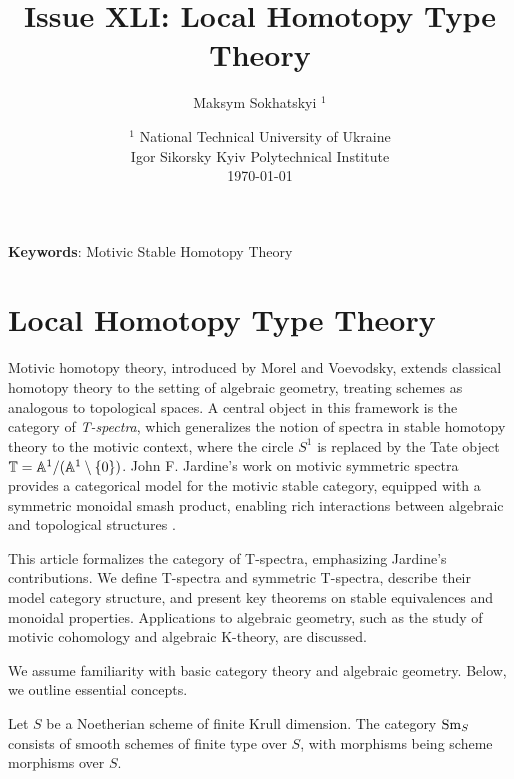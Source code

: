 \documentclass{article}
\begin{document}
\title{Issue XLI: Local Homotopy Type Theory}
\author{Maksym Sokhatskyi $^1$}
\date{ $^1$ National Technical University of Ukraine \\
       \small Igor Sikorsky Kyiv Polytechnical Institute \\
       \today }

\maketitle

\begin{abstract}
\end{abstract}

{\bf Keywords}: Motivic Stable Homotopy Theory

\ifincludeTOC
  \tableofcontents
\fi

\section{Local Homotopy Type Theory}

Motivic homotopy theory, introduced by Morel and Voevodsky, extends classical homotopy
theory to the setting of algebraic geometry, treating schemes as analogous to topological spaces.
A central object in this framework is the category of \emph{T-spectra}, which generalizes
the notion of spectra in stable homotopy theory to the motivic context, where
the circle \( S^1 \) is replaced by the Tate object \( \mathbb{T} = \mathbb{A}^1 / (\mathbb{A}^1 \setminus \{0\}) \).
John F. Jardine’s work on motivic symmetric spectra provides a categorical model for the
motivic stable category, equipped with a symmetric monoidal smash product, enabling rich
interactions between algebraic and topological structures \cite{Jardine2000MotivicSS}.

This article formalizes the category of T-spectra, emphasizing Jardine’s contributions.
We define T-spectra and symmetric T-spectra, describe their model category structure,
and present key theorems on stable equivalences and monoidal properties. Applications
to algebraic geometry, such as the study of motivic cohomology and algebraic K-theory, are discussed.

We assume familiarity with basic category theory and algebraic geometry. Below, we outline essential concepts.

\begin{definition}
Let \( S \) be a Noetherian scheme of finite Krull dimension. The category \( \text{Sm}_S \) consists of smooth schemes of finite type over \( S \), with morphisms being scheme morphisms over \( S \).
\end{definition}
\end{document}

